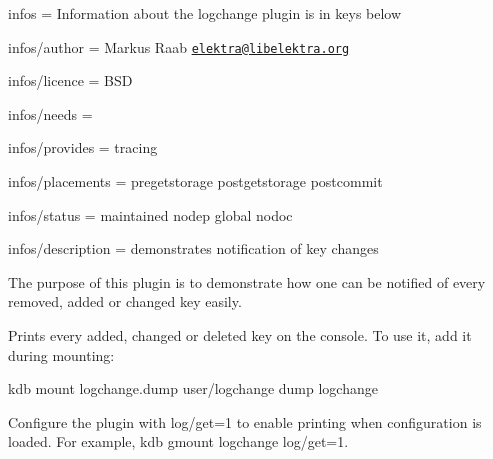 
\begin{DoxyItemize}
\item infos = Information about the logchange plugin is in keys below
\item infos/author = Markus Raab \href{mailto:elektra@libelektra.org}{\tt elektra@libelektra.\+org}
\item infos/licence = B\+SD
\item infos/needs =
\item infos/provides = tracing
\item infos/placements = pregetstorage postgetstorage postcommit
\item infos/status = maintained nodep global nodoc
\item infos/description = demonstrates notification of key changes
\end{DoxyItemize}

The purpose of this plugin is to demonstrate how one can be notified of every removed, added or changed key easily.

Prints every added, changed or deleted key on the console. To use it, add it during mounting\+:


\begin{DoxyCode}
kdb mount logchange.dump user/logchange dump logchange
\end{DoxyCode}


Configure the plugin with {\ttfamily log/get=1} to enable printing when configuration is loaded. For example, {\ttfamily kdb gmount logchange log/get=1}. 